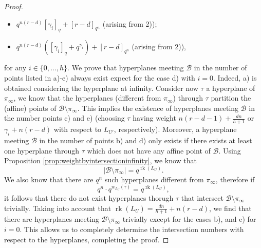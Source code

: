 \documentclass[11pt]{amsart}
\DeclareMathOperator{\rk}{rk}
\begin{document}
\begin{proof}
\begin{itemize}
    \item[d)] $q^{n(r-d)}[\gamma_i]_q +[r-d]_{q^n}$ (arising from 2));
    \item[e)]  $q^{n(r-d)}([\gamma_i]_q+q^{\gamma_i}) +[r-d]_{q^n}$ (arising from 2)),
\end{itemize}
for any $i \in \{0,\ldots,h\}$.
We prove that hyperplanes meeting $\mathcal{B}$ in the number of points listed in a)-e) always exist expect for the case d) with $i=0$. Indeed, a) is obtained considering the hyperplane at infinity. Consider now $\tau$ a hyperplane of $\pi_{\infty}$, we know that the hyperplanes (different from $\pi_\infty$) through $\tau$ partition the (affine) points of $\mathcal{B}\setminus  \pi_\infty$. This implies the existence of hyperplanes meeting $\mathcal{B}$ in the number points c) and e) (choosing $\tau$ having weight $n(r-d-1)+\frac{dn}{h+1}$ or $\gamma_i+n(r-d)$ with respect to $L_{U'}$, respectively). Moreover, a hyperplane meeting $\mathcal{B}$ in the number of points b) and d) only exists if there exists at least one hyperplane through $\tau$ which does not have any affine point of $\mathcal{B}$.
Using Proposition \ref{prop:weightbyintersectioninfinity}, we know that
$$\lvert\mathcal{B}\setminus \pi_\infty \rvert=q^{\rk(L_U)}.$$
We also know that there are $q^n$ such hyperplanes different from $\pi_\infty$, 
therefore if
$$q^n\cdot q^{w_{L_{U}}(\tau)}=q^{\rk(L_U)},$$
it follows that there do not exist hyperplanes thorugh $\tau$ that intersect $\mathcal{B}\setminus \pi_\infty$ trivially.
Taking into account that $\rk(L_U)= \frac{dn}{h+1}+ n(r-d)$, we find that
there are hyperplanes meeting $\mathcal{B}\setminus \pi_\infty$ trivially except for the cases b), and e) for $i=0$.
This allows us to completely determine the intersection numbers with respect to the hyperplanes, completing the proof.
\end{proof}
\end{document}
